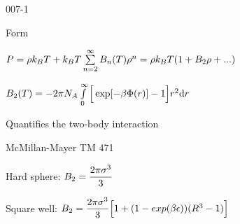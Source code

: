 \begin{mitframe}{007-1} %

    
\begin{listone}
    
    \item Form
    
    \begin{listtwo}
    
    	\item $\p = \dens\boltz\Temp + \boltz\Temp\sum\limits_{n=2}^\infty\virialcoeff{n}(\Temp)\dens^{n} = \dens\boltz\Temp(1+\virialcoeff{2}\dens+...)$     %
    
    	\item $\virialcoeff{2}(\Temp) = -2\pie\av\int\limits_{0}^{\infty}\Big[\exp[-\boltznorm\pot(\pos)]-1\Big]\pos^2\mathrm{d}\pos$ 
	
    
    
    	\begin{listthree}
    
    		\item Quantifies the two-body interaction
            
            \begin{listfour}
    
    			\item McMillan-Mayer TM 471

			\end{listfour}

    		\item Hard sphere: $\virialcoeff{2} = \dfrac{2\pie\molecrad^3}{3}$
    
    
    		\item Square well: $\virialcoeff{2} = \dfrac{2\pie\molecrad^3}{3}\Big[1+(1-exp(\boltznorm\welldepth))(\gasconst^3-1)\Big] $

	


\end{listthree}
\end{listtwo}
\end{listone}
\end{mitframe}
